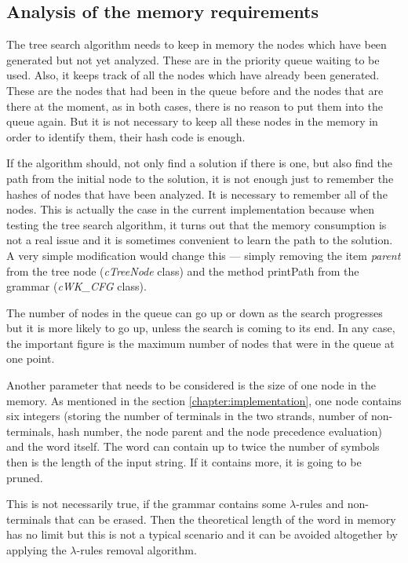 \subsection{Analysis of the memory requirements}
The tree search algorithm needs to keep in memory the nodes which have been generated but not yet analyzed. These are in the priority queue waiting to be used. Also, it keeps track of all the nodes which have already been generated. These are the nodes that had been in the queue before and the nodes that are there at the moment, as in both cases, there is no reason to put them into the queue again. But it is not necessary to keep all these nodes in the memory in order to identify them, their hash code is enough.

If the algorithm should, not only find a solution if there is one, but also find the path from the initial node to the solution, it is not enough just to remember the hashes of nodes that have been analyzed. It is necessary to remember all of the nodes. This is actually the case in the current implementation because when testing the tree search algorithm, it turns out that the memory consumption is not a real issue and it is sometimes convenient to learn the path to the solution. A very simple modification would change this --- simply removing the item \textit{parent} from the tree node (\textit{cTreeNode} class) and the method printPath from the grammar (\textit{cWK\_CFG} class).

The number of nodes in the queue can go up or down as the search progresses but it is more likely to go up, unless the search is coming to its end. In any case, the important figure is the maximum number of nodes that were in the queue at one point.

Another parameter that needs to be considered is the size of one node in the memory. As mentioned in the section \ref{chapter:implementation}, one node contains six integers (storing the number of terminals in the two strands, number of non-terminals, hash number, the node parent and the node precedence evaluation) and the word itself. The word can contain up to twice the number of symbols then is the length of the input string. If it contains more, it is going to be pruned.

This is not necessarily true, if the grammar contains some $\lambda$-rules and non-terminals that can be erased. Then the theoretical length of the word in memory has no limit but this is not a typical scenario and it can be avoided altogether by applying the $\lambda$-rules removal algorithm.

